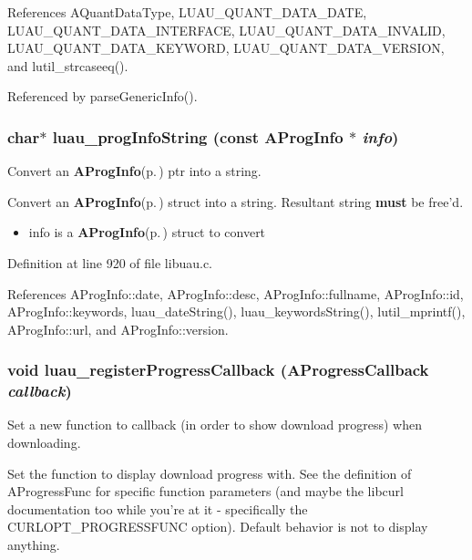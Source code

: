 References AQuant\-Data\-Type, LUAU\_\-QUANT\_\-DATA\_\-DATE, LUAU\_\-QUANT\_\-DATA\_\-INTERFACE, LUAU\_\-QUANT\_\-DATA\_\-INVALID, LUAU\_\-QUANT\_\-DATA\_\-KEYWORD, LUAU\_\-QUANT\_\-DATA\_\-VERSION, and lutil\_\-strcaseeq().

Referenced by parse\-Generic\-Info().
\subsubsection{\setlength{\rightskip}{0pt plus 5cm}char$\ast$ luau\_\-prog\-Info\-String (const {\bf AProg\-Info} $\ast$ {\em info})}\label{libuau_8h_a65}


Convert an {\bf AProg\-Info}{\rm (p.\,\pageref{structAProgInfo})} ptr into a string. 

Convert an {\bf AProg\-Info}{\rm (p.\,\pageref{structAProgInfo})} struct into a string. Resultant string {\bf must} be free'd.

\begin{itemize}
\item info is a {\bf AProg\-Info}{\rm (p.\,\pageref{structAProgInfo})} struct to convert 
\end{itemize}


Definition at line 920 of file libuau.c.

References AProg\-Info::date, AProg\-Info::desc, AProg\-Info::fullname, AProg\-Info::id, AProg\-Info::keywords, luau\_\-date\-String(), luau\_\-keywords\-String(), lutil\_\-mprintf(), AProg\-Info::url, and AProg\-Info::version.
\subsubsection{\setlength{\rightskip}{0pt plus 5cm}void luau\_\-register\-Progress\-Callback ({\bf AProgress\-Callback} {\em callback})}\label{libuau_8h_a59}


Set a new function to callback (in order to show download progress) when downloading. 

Set the function to display download progress with. See the definition of AProgress\-Func for specific function parameters (and maybe the libcurl documentation too while you're at it - specifically the CURLOPT\_\-PROGRESSFUNC option). Default behavior is not to display anything.


